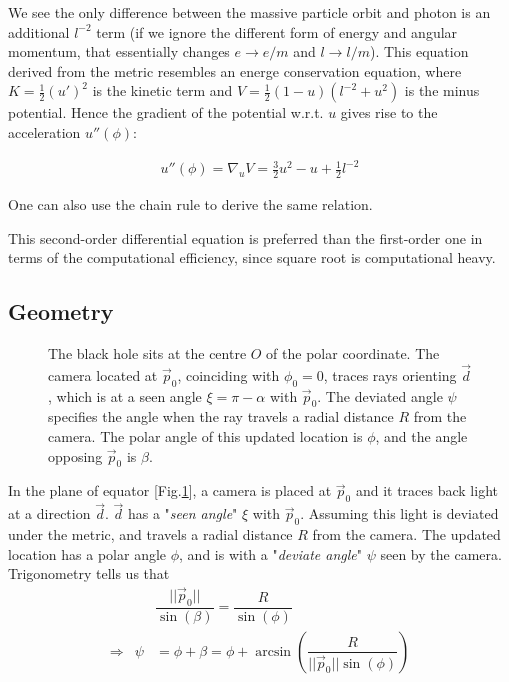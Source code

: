 We see the only difference between the massive particle orbit and photon is an additional $l^{-2}$ term (if we ignore the different form of energy and angular momentum, that essentially changes $e\rightarrow e/m$ and $l\rightarrow l/m$).
This equation derived from the metric resembles an energe conservation equation, where $K = \frac{1}{2}(u')^2$ is the kinetic term and $V = \frac{1}{2}( 1-u ) ( l^{-2} + u^2 )$ is the minus potential. Hence the gradient of the potential w.r.t. $u$ gives rise to the acceleration $u''(\phi)$:

\begin{align}
u''(\phi) = \nabla_u V = \frac{3}{2} u ^2 - u + \frac{1}{2} l^{-2}
\label{eqn:second_order_ode}
\end{align}

One can also use the chain rule to derive the same relation.

This second-order differential equation is preferred than the first-order one in terms of the computational efficiency, since square root is computational heavy.

\subsection{Geometry}
\begin{figure}[ht]
\centering
\def\svgwidth{0.9\columnwidth}

\caption{The black hole sits at the centre $O$ of the polar coordinate. The camera located at $\vec{p}_0$, coinciding with $\phi_0 = 0$, traces rays orienting $\vec{d}$, which is at a seen angle $\xi = \pi - \alpha$ with $\vec{p}_0$. The deviated angle $\psi$ specifies the angle when the ray travels a radial distance $R$ from the camera. The polar angle of this updated location is $\phi$, and the angle opposing $\vec{p}_0$ is $\beta$.}
\label{fig:polar_tracing}
\end{figure}


In the plane of equator [Fig.\ref{fig:polar_tracing}], a camera is placed at $\vec{p}_0$ and it traces back light at a direction $\vec{d}$. $\vec{d}$ has a "\textit{seen angle}" $\xi$ with $\vec{p}_0$. Assuming this light is deviated under the metric, and travels a radial distance $R$ from the camera. The updated location has a polar angle $\phi$, and is with a  "\textit{deviate angle}" $\psi$ seen by the camera. Trigonometry tells us that
\begin{eqnarray}
&&\dfrac{||\vec{p}_0||}{\sin(\beta)} = \dfrac{R}{\sin(\phi)} \\
\Longrightarrow &\psi& = \phi + \beta = \phi + \arcsin\left( \dfrac{R}{||\vec{p}_0||\sin(\phi)} \right)
\end{eqnarray}

